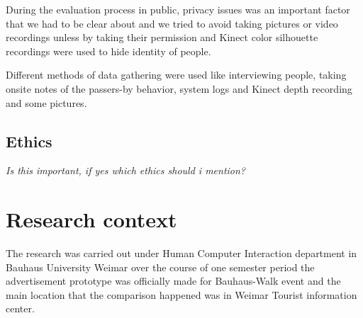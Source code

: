 During the evaluation process in public, privacy issues was an important factor that we had to be clear about and we tried to avoid taking pictures or video recordings unless by taking their permission and Kinect color silhouette recordings were used to hide identity of people.

Different methods of data gathering were used like interviewing people, taking onsite notes of the passers-by behavior, system logs and Kinect depth recording and some pictures. 


\subsection{Ethics}

\emph{Is this important, if yes which ethics should i mention?}


\section{Research context}
The research was carried out under Human Computer Interaction department in Bauhaus University Weimar over the course of one semester period the advertisement prototype was officially made for Bauhaus-Walk event and the main location that the comparison happened was in Weimar Tourist information center.



